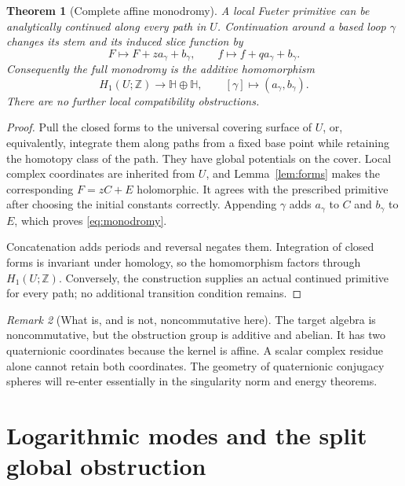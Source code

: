 \documentclass[11pt,a4paper]{article}
\numberwithin{equation}{section}
\newtheorem{theorem}{Theorem}[section]
\theoremstyle{definition}
\theoremstyle{remark}
\newtheorem{remark}[theorem]{Remark}
\newcommand{\HH}{\mathbb H}
\begin{document}
\begin{theorem}[Complete affine monodromy]\label{thm:monodromy}
A local Fueter primitive can be analytically continued along every path in
$U$. Continuation around a based loop $\gamma$ changes its stem and its
induced slice function by
\begin{equation}
 F\longmapsto F+z a_\gamma+b_\gamma,\qquad
 f\longmapsto f+q a_\gamma+b_\gamma.\label{eq:monodromy}
\end{equation}
Consequently the full monodromy is the additive homomorphism
\begin{equation}
 H_1(U;\mathbb Z)\longrightarrow\HH\oplus\HH,
 \qquad [\gamma]\longmapsto(a_\gamma,b_\gamma).\label{eq:monodromy-map}
\end{equation}
There are no further local compatibility obstructions.
\end{theorem}
\begin{proof}
Pull the closed forms to the universal covering surface of $U$, or,
equivalently, integrate them along paths from a fixed base point while
retaining the homotopy class of the path. They have global potentials on
the cover. Local complex coordinates are inherited from $U$, and
Lemma~\ref{lem:forms} makes the corresponding $F=zC+E$ holomorphic.
It agrees with the prescribed primitive after choosing the initial
constants correctly. Appending $\gamma$ adds $a_\gamma$ to $C$ and
$b_\gamma$ to $E$, which proves \eqref{eq:monodromy}.

Concatenation adds periods and reversal negates them. Integration of
closed forms is invariant under homology, so the homomorphism factors
through $H_1(U;\mathbb Z)$. Conversely, the construction supplies an
actual continued primitive for every path; no additional transition
condition remains.
\end{proof}

\begin{remark}[What is, and is not, noncommutative here]
The target algebra is noncommutative, but the obstruction group is additive
and abelian. It has two quaternionic coordinates because the kernel is
affine. A scalar complex residue alone cannot retain both coordinates.
The geometry of quaternionic conjugacy spheres will re-enter essentially
in the singularity norm and energy theorems.
\end{remark}

\section{Logarithmic modes and the split global obstruction}
\label{sec:modes}
\end{document}
